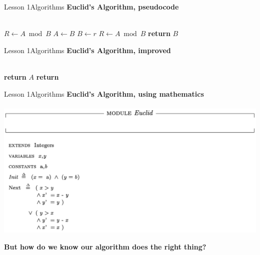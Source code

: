 \documentclass[aspectratio=1610]{beamer}
\begin{document}
\begin{frame}{Lesson 1}{Algorithms}
\Large
\textbf{Euclid's Algorithm, pseudocode}\\~\\

\label{GCD}
\begin{algorithmic}[1]
   \State $R\gets A\bmod B$
      \State $A\gets B$
      \State $B\gets r$
      \State $R\gets A\bmod B$
   \EndWhile\label{GCDendwhile}
   \State \textbf{return} $B$
\EndProcedure
\end{algorithmic}
\end{frame}



\begin{frame}{Lesson 1}{Algorithms}
\Large
\textbf{Euclid's Algorithm, improved}\\~\\

\label{Euclid}
\begin{algorithmic}[1]
    \State \textbf{return} $A$
\Else \State \textbf{return} 
\EndIf
\EndProcedure
\end{algorithmic}
\end{frame}



\begin{frame}{Lesson 1}{Algorithms}
\Large
\textbf{Euclid's Algorithm, using mathematics}\\~\\
\includegraphics[scale=0.5]{Images/gcdtla}
\end{frame}


\begin{frame}
\begin{center}
\Huge 
\textbf {But how do we know our algorithm does the right thing?}
\end{center}
\end{frame}
\end{document}
